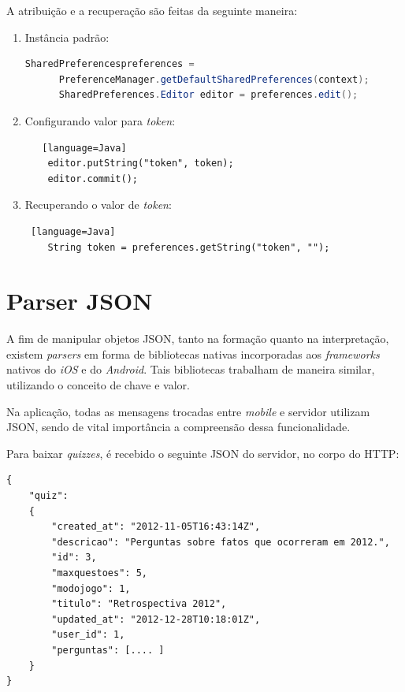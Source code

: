 	A atribuição e a recuperação são feitas da seguinte maneira:
\begin{enumerate}
\item Instância padrão:
  \begin{lstlisting}[language=Java]
      SharedPreferencespreferences = 
	  PreferenceManager.getDefaultSharedPreferences(context);
      SharedPreferences.Editor editor = preferences.edit();
  \end{lstlisting} 
     
\item Configurando valor para \emph{token}:
\begin{lstlisting}   [language=Java]
    editor.putString("token", token);
    editor.commit();
 \end{lstlisting}       
\item Recuperando o valor de \emph{token}:
\begin{lstlisting} [language=Java]
    String token = preferences.getString("token", "");
\end{lstlisting}   
\end{enumerate}     
     
    \section {Parser JSON}
     
            A fim de manipular objetos \ac{JSON}, tanto na formação quanto na interpretação, existem \emph{parsers} em forma de bibliotecas nativas incorporadas aos \emph{frameworks} nativos do \emph{iOS} e do \emph{Android}. Tais bibliotecas trabalham de maneira similar, utilizando o conceito de chave e valor.
            
			Na aplicação, todas as mensagens trocadas entre \emph{mobile} e servidor utilizam \ac{JSON}, sendo de vital importância a compreensão dessa funcionalidade.
            
			Para baixar \emph{quizzes}, é recebido o seguinte \ac{JSON} do servidor, no corpo do \ac{HTTP}:
\begin{lstlisting}   
{
    "quiz": 
    {
        "created_at": "2012-11-05T16:43:14Z",
        "descricao": "Perguntas sobre fatos que ocorreram em 2012.",
        "id": 3,
        "maxquestoes": 5,
        "modojogo": 1,
        "titulo": "Retrospectiva 2012",
        "updated_at": "2012-12-28T10:18:01Z",
        "user_id": 1,
        "perguntas": [.... ]
    }
}
     \end{lstlisting}   
    
